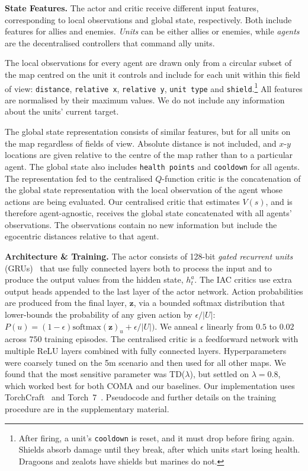 \documentclass[letterpaper]{article}
\newcommand{\citep}{\cite}
\newcommand{\myvec}[1]{\mathbf{#1}}
\newcommand{\vz}{\myvec{z}}
\newcommand{\mysoftmax}[1]{{\ensuremath{\text{softmax}(#1)}}}
\begin{document}
\textbf{State Features.}
\label{ssec:features}
The actor and critic receive different input features, corresponding to local
observations and global state, respectively. Both include features for allies
and enemies. \emph{Units} can be either allies or enemies, while \emph{agents} are
the decentralised controllers that command ally units.

The local observations for every agent are drawn only from a circular subset of
the map centred on the unit it controls and include for each unit within this 
field of view:
%
\texttt{distance}, \texttt{relative x}, \texttt{relative
y}, \texttt{unit type} and \texttt{shield}.\footnote{After firing, a unit's 
\texttt{cooldown} is reset, and it must drop
before firing again. Shields absorb damage until they break, after which units
start losing health. Dragoons and zealots have shields but marines do not.}
%
All features are normalised by their maximum values. We do not include any 
information about the units' current target.

The global state representation consists of similar features, but for
all units on the map regardless of fields of view. Absolute distance is not 
included, and $x$-$y$ locations are given relative to the centre of the map 
rather than to a particular agent. The global state also includes 
\texttt{health points} and \texttt{cooldown} for all agents. The representation 
fed
to the centralised $Q$-function critic is the concatenation of the global state 
representation with the 
local observation of the agent whose actions are being evaluated. Our 
centralised critic that estimates $V(s)$, 
and is therefore agent-agnostic, receives the global state concatenated with 
all agents' observations. The observations contain no new information but 
include the egocentric distances relative to that agent.

\textbf{Architecture \& Training.}
\label{ssec:architecture} 
The actor consists of 128-bit \emph{gated recurrent units} 
(GRUs)~\citep{cho2014properties} that use fully connected layers both to 
process the input and to produce the output values from the hidden state, 
$h^a_t$. The IAC critics use extra output heads appended to the last layer of 
the actor network. Action probabilities are produced from the final layer, 
$\vz$, via a bounded softmax distribution that lower-bounds the probability of 
any given action by $\epsilon / |U|$:  $P(u) = (1- \epsilon) \mysoftmax{\vz}_u 
+  \epsilon / |U|)$. We anneal $\epsilon$ linearly from $0.5$ to $0.02$ across 
$750$ training episodes. The centralised critic is a feedforward network with 
multiple ReLU layers combined with fully connected layers.  Hyperparameters 
were coarsely tuned on the 5m scenario and then used for all other 
maps. We found that the most sensitive parameter was TD($\lambda$), but settled 
on $\lambda=0.8$, which worked best for both COMA 
and our baselines. Our implementation uses 
TorchCraft~\citep{synnaeve2016torchcraft} and \mbox{Torch 7}~\citep{torch}. Pseudocode and
further details on the training procedure are in the 
supplementary material.
\end{document}
